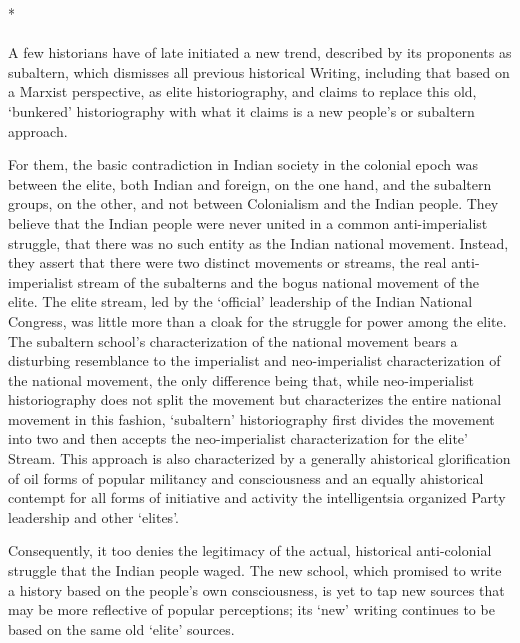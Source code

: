 \begin{multicols}{2}
\begin{center}*\end{center}

\paragraph*{}
A few historians have of late initiated a new trend, described by its proponents as subaltern, which dismisses all previous historical Writing, including that based on a Marxist perspective, as elite historiography, and claims to replace this old, `bunkered' historiography with what it claims is a new people's or subaltern approach.

For them, the basic contradiction in Indian society in the colonial epoch was between the elite, both Indian and foreign, on the one hand, and the subaltern groups, on the other, and not between Colonialism and the Indian people. They believe that the Indian people were never united in a common anti-imperialist struggle, that there was no such entity as the Indian national movement. Instead, they assert that there were two distinct movements or streams, the real anti-imperialist stream of the subalterns and the bogus national movement of the elite. The elite stream, led by the `official' leadership of the Indian National Congress, was little more than a cloak for the struggle for power among the elite. The subaltern school's characterization of the national movement bears a disturbing resemblance to the imperialist and neo-imperialist characterization of the national movement, the only difference being that, while neo-imperialist historiography does not split the movement but characterizes the entire national movement in this fashion, `subaltern' historiography first divides the movement into two and then accepts the neo-imperialist characterization for the elite' Stream. This approach is also characterized by a generally ahistorical glorification of oil forms of popular militancy and consciousness and an equally ahistorical contempt for all forms of initiative and activity the intelligentsia organized Party leadership and other `elites'.

Consequently, it too denies the legitimacy of the actual, historical anti-colonial struggle that the Indian people waged. The new school, which promised to write a history based on the people's own consciousness, is yet to tap new sources that may be more reflective of popular perceptions; its `new' writing continues to be based on the same old `elite' sources.


\end{multicols}
